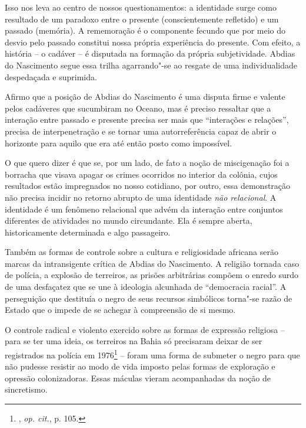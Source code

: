 Isso nos leva ao centro de nossos questionamentos: a identidade surge
como resultado de um paradoxo entre o presente (conscientemente
refletido) e um passado (memória).
A rememoração é o componente
fecundo que por meio do desvio pelo passado constitui nossa própria
experiência do presente. Com efeito, a história -- o cadáver -- é
disputada na formação da própria subjetividade. Abdias do Nascimento
segue essa trilha agarrando"-se ao resgate de uma individualidade
despedaçada e suprimida.

Afirmo que a posição de Abdias do Nascimento é uma disputa firme e
valente pelos cadáveres que sucumbiram no Oceano, mas é preciso
ressaltar que a interação entre passado e presente precisa ser mais que
``interações e relações'', precisa de interpenetração e se tornar uma
autorreferência capaz de abrir o horizonte para aquilo que era até então
posto como impossível.

O que quero dizer é que se, por um lado, de fato a noção de miscigenação
foi a borracha que visava apagar os crimes ocorridos no interior da
colônia, cujos resultados estão impregnados no nosso cotidiano, por
outro, essa demonstração não precisa incidir no retorno abrupto de uma
identidade \emph{não relacional}. A identidade é um fenômeno relacional
que advém da interação entre conjuntos diferentes de atividades no mundo
circundante. Ela é sempre aberta, historicamente determinada e algo
passageiro.

\asterisc

Também as formas de controle sobre a cultura e religiosidade africana
serão marcas da intransigente crítica de Abdias do Nascimento. A
religião tornada caso de polícia, a explosão de terreiros, as prisões
arbitrárias compõem o enredo surdo de uma desfaçatez que se une à
ideologia alcunhada de ``democracia racial''. A perseguição que destituía
o negro de seus recursos simbólicos torna"-se razão de Estado que o
impede de se achegar à compreensão de si mesmo.

O controle radical e violento exercido sobre as formas de expressão
religiosa -- para se ter uma ideia, os terreiros na Bahia só precisaram
deixar de ser registrados na polícia em 1976\footnote{, \emph{op.
  cit.}, p. 105.} -- foram uma forma de submeter o negro para que não
pudesse resistir ao modo de vida imposto pelas formas de exploração e
opressão colonizadoras. Essas máculas vieram acompanhadas da noção de
sincretismo.

